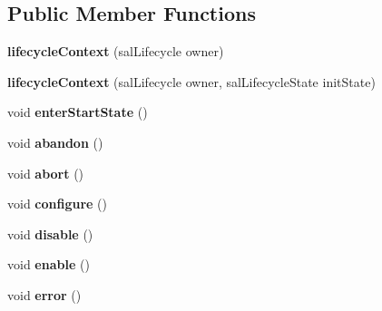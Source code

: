 \subsection*{Public Member Functions}
\begin{DoxyCompactItemize}
\item 
\hypertarget{classlifecycle_1_1lifecycle_context_aa0d94fd5dbd193ba23468eda718e138e}{{\bfseries lifecycle\-Context} (sal\-Lifecycle owner)}\label{classlifecycle_1_1lifecycle_context_aa0d94fd5dbd193ba23468eda718e138e}

\item 
\hypertarget{classlifecycle_1_1lifecycle_context_a325aceffd0cecc00906909594ca1d39c}{{\bfseries lifecycle\-Context} (sal\-Lifecycle owner, sal\-Lifecycle\-State init\-State)}\label{classlifecycle_1_1lifecycle_context_a325aceffd0cecc00906909594ca1d39c}

\item 
\hypertarget{classlifecycle_1_1lifecycle_context_a02fcfbd46cb162c48089417259d7f981}{void {\bfseries enter\-Start\-State} ()}\label{classlifecycle_1_1lifecycle_context_a02fcfbd46cb162c48089417259d7f981}

\item 
\hypertarget{classlifecycle_1_1lifecycle_context_abb276a40ad589da643c638b2afa6851a}{void {\bfseries abandon} ()}\label{classlifecycle_1_1lifecycle_context_abb276a40ad589da643c638b2afa6851a}

\item 
\hypertarget{classlifecycle_1_1lifecycle_context_abdf68490cd047760deed7e3b47c5dd5b}{void {\bfseries abort} ()}\label{classlifecycle_1_1lifecycle_context_abdf68490cd047760deed7e3b47c5dd5b}

\item 
\hypertarget{classlifecycle_1_1lifecycle_context_a4153dae9ae0fff9219e7e423e7605032}{void {\bfseries configure} ()}\label{classlifecycle_1_1lifecycle_context_a4153dae9ae0fff9219e7e423e7605032}

\item 
\hypertarget{classlifecycle_1_1lifecycle_context_a269cc798b29fe304ac0ff322dd6e3ef6}{void {\bfseries disable} ()}\label{classlifecycle_1_1lifecycle_context_a269cc798b29fe304ac0ff322dd6e3ef6}

\item 
\hypertarget{classlifecycle_1_1lifecycle_context_af11d19f995942aa41d777649136fcdf0}{void {\bfseries enable} ()}\label{classlifecycle_1_1lifecycle_context_af11d19f995942aa41d777649136fcdf0}

\item 
\hypertarget{classlifecycle_1_1lifecycle_context_a08978208475456131d53be4f825c708e}{void {\bfseries error} ()}\label{classlifecycle_1_1lifecycle_context_a08978208475456131d53be4f825c708e}


\end{DoxyCompactItemize}
